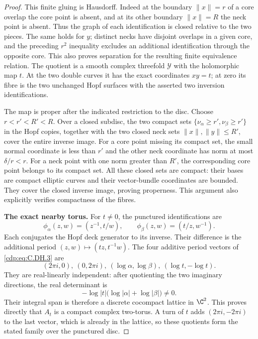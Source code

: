 \begin{proof}
This finite gluing is Hausdorff.
Indeed at the boundary $\|x\|=r$
of a core overlap the core
point is absent, and at its
other boundary $\|x\|=R$ the
neck point is absent. Thus
the graph of each identification
is closed relative to the
two pieces. The same holds
for $y$; distinct necks have
disjoint overlaps in a given
core, and the preceding
$r^2$ inequality excludes
an additional identification
through the opposite core.
This also proves separation
for the resulting finite
equivalence relation. The
quotient is a smooth complex
threefold $\mathcal Y$ with
the holomorphic map $t$.
At the two double curves it
has the exact coordinates
$xy=t$; at zero its fibre
is the two unchanged Hopf
surfaces with the asserted
two inversion identifications.

The map is proper after the
indicated restriction to the
disc. Choose
$r<r'<R'<R$.
Over a closed subdisc,
the two compact sets
$\{\nu_\alpha\ge r',\nu_\beta\ge r'\}$
in the Hopf copies, together
with the two closed neck sets
$\|x\|,\|y\|\le R'$, cover
the entire inverse image.
For a core point missing its
compact set, the small normal
coordinate is less than $r'$
and the other neck coordinate
has norm at most $\delta/r<r$.
For a neck point with one
norm greater than $R'$,
the corresponding core point
belongs to its compact set.
All these closed sets are
compact: their bases are
compact elliptic curves and
their vector-bundle coordinates
are bounded. They cover the
closed inverse image, proving
properness. This argument
also explicitly verifies
compactness of the fibres.

\par\medskip\noindent\textbf{The exact nearby torus.}
For $t\ne0$, the punctured
identifications are
\[
 \phi_\alpha(z,w)=(z^{-1},t/w),\qquad
 \phi_\beta(z,w)=(t/z,w^{-1}).                       \tag{C.DH.9}\label{cdp:eq:C.DH.9}
\]
Each conjugates the Hopf deck
generator to its inverse.
Their difference is the
additional period
$(z,w)\mapsto(tz,t^{-1}w)$.
The four additive period
vectors of \eqref{cdp:eq:C.DH.3} are
\[
 (2\pi i,0),\ (0,2\pi i),\
 (\log\alpha,\log\beta),\
                         (\log t,-\log t).          \tag{C.DH.10}\label{cdp:eq:C.DH.10}
\]
They are real-linearly
independent: after quotienting
the two imaginary directions,
the real determinant is
\[
       -\log|t|\bigl(\log|\alpha|+\log|\beta|\bigr)
                                      \ne0.          \tag{C.DH.11}\label{cdp:eq:C.DH.11}
\]
Their integral span is
therefore a discrete
cocompact lattice in $\C^2$.
This proves directly that
$A_t$ is a compact complex
two-torus. A turn of $t$
adds $(2\pi i,-2\pi i)$
to the last vector, which
is already in the lattice,
so these quotients form
the stated family over
the punctured disc.


\end{proof}
